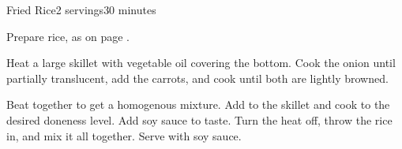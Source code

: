 \documentclass[../Cookbook.tex]{subfiles}
\begin{document}
\begin{recipe}{Fried Rice}{2 servings}{30 minutes}

Prepare rice, as on page \pageref{Rice}.

Heat a large skillet with vegetable oil covering the bottom. Cook the onion until partially translucent, add the carrots, and cook until both are lightly browned.

Beat together to get a homogenous mixture. Add to the skillet and cook to the desired doneness level. Add soy sauce to taste. Turn the heat off, throw the rice in, and mix it all together. Serve with soy sauce.

\end{recipe}
\end{document}
